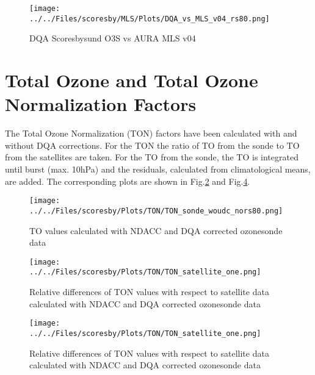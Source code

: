                             \begin{figure}
        \centering
\texttt{[image: ../../Files/scoresby/MLS/Plots/DQA\_vs\_MLS\_v04\_rs80.png]}
    \caption{DQA Scoresbysund O3S vs AURA MLS v04 }
            \label{fig:dqav04_rs80}
    \end{figure}

        \section{Total Ozone and Total Ozone Normalization Factors}

The Total Ozone Normalization (TON) factors have been calculated with and without DQA corrections. For the TON
the ratio of TO from the sonde to TO from the satellites are taken. For the TO from the sonde, the TO is integrated until
burst (max. 10hPa) and the residuals, calculated from climatological means, are added.
The corresponding plots are shown in Fig.\ref{fig:ton1} and  Fig.\ref{fig:ton3}.

                                \begin{figure}
        \centering
\texttt{[image: ../../Files/scoresby/Plots/TON/TON\_sonde\_woudc\_nors80.png]}
    \caption{TO values calculated with NDACC and DQA corrected ozonesonde data}
            \label{fig:ton1}
    \end{figure}

                                 \begin{figure}
        \centering
\texttt{[image: ../../Files/scoresby/Plots/TON/TON\_satellite\_one.png]}
    \caption{Relative differences of TON values with respect to satellite data calculated with NDACC and DQA corrected ozonesonde data}
            \label{fig:ton2}
    \end{figure}

                                     \begin{figure}
        \centering
\texttt{[image: ../../Files/scoresby/Plots/TON/TON\_satellite\_one.png]}
    \caption{Relative differences of TON values with respect to satellite data calculated with NDACC and DQA corrected ozonesonde data}
            \label{fig:ton3}
    \end{figure}


